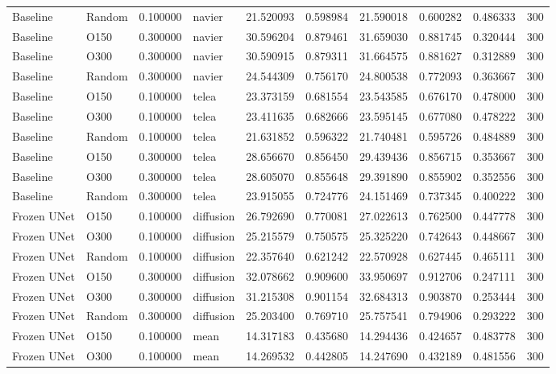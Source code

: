 \begin{table}[h]
\begin{tabular}{llrlrrrrrr}
Baseline & Random & 0.100000 & navier & 21.520093 & 0.598984 & 21.590018 & 0.600282 & 0.486333 & 300 \\
Baseline & O150 & 0.300000 & navier & 30.596204 & 0.879461 & 31.659030 & 0.881745 & 0.320444 & 300 \\
Baseline & O300 & 0.300000 & navier & 30.590915 & 0.879311 & 31.664575 & 0.881627 & 0.312889 & 300 \\
Baseline & Random & 0.300000 & navier & 24.544309 & 0.756170 & 24.800538 & 0.772093 & 0.363667 & 300 \\
Baseline & O150 & 0.100000 & telea & 23.373159 & 0.681554 & 23.543585 & 0.676170 & 0.478000 & 300 \\
Baseline & O300 & 0.100000 & telea & 23.411635 & 0.682666 & 23.595145 & 0.677080 & 0.478222 & 300 \\
Baseline & Random & 0.100000 & telea & 21.631852 & 0.596322 & 21.740481 & 0.595726 & 0.484889 & 300 \\
Baseline & O150 & 0.300000 & telea & 28.656670 & 0.856450 & 29.439436 & 0.856715 & 0.353667 & 300 \\
Baseline & O300 & 0.300000 & telea & 28.605070 & 0.855648 & 29.391890 & 0.855902 & 0.352556 & 300 \\
Baseline & Random & 0.300000 & telea & 23.915055 & 0.724776 & 24.151469 & 0.737345 & 0.400222 & 300 \\
Frozen UNet & O150 & 0.100000 & diffusion & 26.792690 & 0.770081 & 27.022613 & 0.762500 & 0.447778 & 300 \\
Frozen UNet & O300 & 0.100000 & diffusion & 25.215579 & 0.750575 & 25.325220 & 0.742643 & 0.448667 & 300 \\
Frozen UNet & Random & 0.100000 & diffusion & 22.357640 & 0.621242 & 22.570928 & 0.627445 & 0.465111 & 300 \\
Frozen UNet & O150 & 0.300000 & diffusion & 32.078662 & 0.909600 & 33.950697 & 0.912706 & 0.247111 & 300 \\
Frozen UNet & O300 & 0.300000 & diffusion & 31.215308 & 0.901154 & 32.684313 & 0.903870 & 0.253444 & 300 \\
Frozen UNet & Random & 0.300000 & diffusion & 25.203400 & 0.769710 & 25.757541 & 0.794906 & 0.293222 & 300 \\
Frozen UNet & O150 & 0.100000 & mean & 14.317183 & 0.435680 & 14.294436 & 0.424657 & 0.483778 & 300 \\
Frozen UNet & O300 & 0.100000 & mean & 14.269532 & 0.442805 & 14.247690 & 0.432189 & 0.481556 & 300 \\

\end{tabular}
\end{table}
